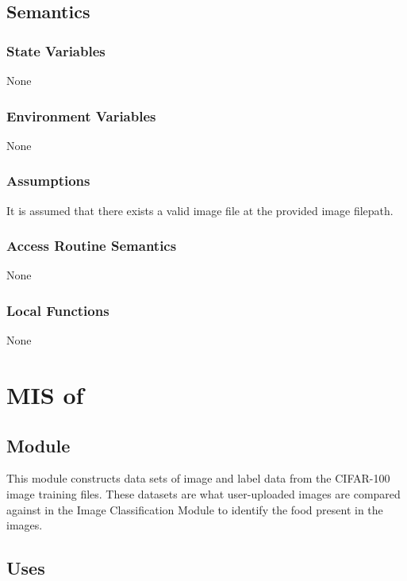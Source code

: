 \documentclass[12pt, titlepage]{article}
\begin{document}
\subsection{Semantics}

\subsubsection{State Variables}

None

\subsubsection{Environment Variables}

None

\subsubsection{Assumptions}

It is assumed that there exists a valid image file at the provided image filepath.

\subsubsection{Access Routine Semantics}

None

\subsubsection{Local Functions}

None

\newpage

\section{MIS of } \label{Module}

\subsection{Module}

This module constructs data sets of image and label data from the CIFAR-100 image training files. These datasets are what user-uploaded images are compared against in the Image Classification Module to identify the food present in the images. 

\subsection{Uses}
\end{document}
